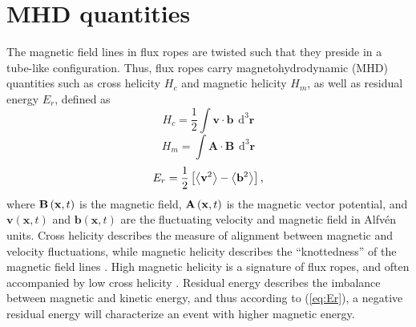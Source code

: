 


\section{MHD quantities}
The magnetic field lines in flux ropes are twisted such that they preside in a tube-like configuration. Thus, flux ropes carry magnetohydrodynamic (MHD) quantities such as cross helicity $H_c$ and magnetic helicity $H_m$, as well as residual energy $E_r$, defined as
\begin{equation}
    H_c = \frac{1}{2}\int \mathbf{v}\cdot\mathbf{b} \hspace{5pt} \mathrm{d^3} \mathbf{r}
    \label{eq:Hc}
\end{equation}
\begin{equation}
    H_m = \int \mathbf{A}\cdot\mathbf{B} \hspace{5pt} \mathrm{d^3} \mathbf{r}
    \label{eq:Hm}
\end{equation}
\begin{equation}
    E_r = \frac{1}{2} \left[ \left \langle \mathbf{v}^2 \right\rangle  - \left \langle \mathbf{b}^2 \right\rangle \right],
    \label{eq:Er}
\end{equation}
where $\mathbf{B}\left( \mathbf{x},t \right)$ is the magnetic field, $\mathbf{A}\left( \mathbf{x},t \right)$ is the magnetic vector potential, and $\mathbf{v}(\mathbf{x},t)$ and $\mathbf{b}(\mathbf{x},t)$ are the fluctuating velocity and magnetic field in Alfv\'en units. Cross helicity describes the measure of alignment between magnetic and velocity fluctuations, while magnetic helicity describes the “knottedness” of the magnetic field lines \citep{Matthaeus:1982}. High magnetic helicity is a signature of flux ropes, and often accompanied by low cross helicity \citep{Zhao:2020}. Residual energy describes the imbalance between magnetic and kinetic energy, and thus according to (\ref{eq:Er}), a negative residual energy will characterize an event with higher magnetic energy.

